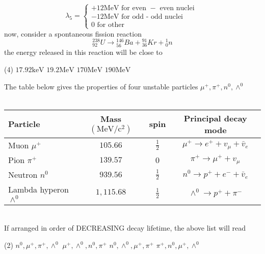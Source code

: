\begin{questions}
\begin{minipage}{\textwidth}
	$$
	\lambda_{5}=\left\{\begin{array}{c}
	+12 \mathrm{MeV} \text { for even }-\text { even nuclei } \\
	-12 \mathrm{MeV} \text { for odd - odd nuclei } \\
	0 \text { for other }
	\end{array}\right.
	$$
	now, consider a spontaneous fission reaction
	$$
	{ }_{92}^{238} U \rightarrow{ }_{56}^{146} B a+{ }_{36}^{91} K r+{ }_{0}^{1} n
	$$
	the energy released in this reaction will be close to
\end{minipage}
\begin{tasks}(4)
	\task[\textbf{A.}] $17.92 \mathrm{keV}$
	\task[\textbf{B.}]   $19.2 \mathrm{MeV}$
	\task[\textbf{C.}] $170 \mathrm{MeV}$
	\task[\textbf{D.}]   $190 \mathrm{MeV}$
\end{tasks}
\begin{minipage}{\textwidth}
	\question The table below gives the properties of four unstable particles $\mu^{+}, \pi^{+}, n^{0}, \wedge^{0}$\\\\
	\renewcommand*{\arraystretch}{2}
	\begin{tabular}{|lccc|}
		\hline 
		Particle & Mass $\left(\mathrm{MeV} / \mathrm{c}^{2}\right)$ & spin & Principal decay mode \\
		\hline Muon $\mu^{+}$ & $105.66$ & $\frac{1}{2}$ & $\mu^{+} \rightarrow e^{+}+v_{\mu}+\bar{v}_{e}$ \\
		Pion $\pi^{+}$ & $139.57$ & 0 & $\pi^{+} \rightarrow \mu^{+}+v_{\mu}$ \\
		Neutron $n^{0}$ & $939.56$ & $\frac{1}{2}$ & $n^{0} \rightarrow p^{+}+e^{-}+\bar{v}_{e}$ \\
		Lambda hyperon $\wedge^{0}$ & $1,115.68$ & $\frac{1}{2}$ & $\wedge^{0} \rightarrow p^{+}+\pi^{-}$ \\
		\hline
	\end{tabular}\\
	If arranged in order of DECREASING decay lifetime, the above list will read 
\end{minipage}
\begin{tasks}(2)
	\task[\textbf{A.}] $n^{0}, \mu^{+}, \pi^{+}, \wedge^{0}$
	\task[\textbf{B.}] $\mu^{+}, \wedge^{0}, n^{0}, \pi^{+}$
	\task[\textbf{C.}]   $n^{0}, \wedge^{0}, \mu^{+}, \pi^{+}$
	\task[\textbf{D.}] $\pi^{+}, n^{0}, \mu^{+}, \wedge^{0}$
\end{tasks}
\end{questions}
